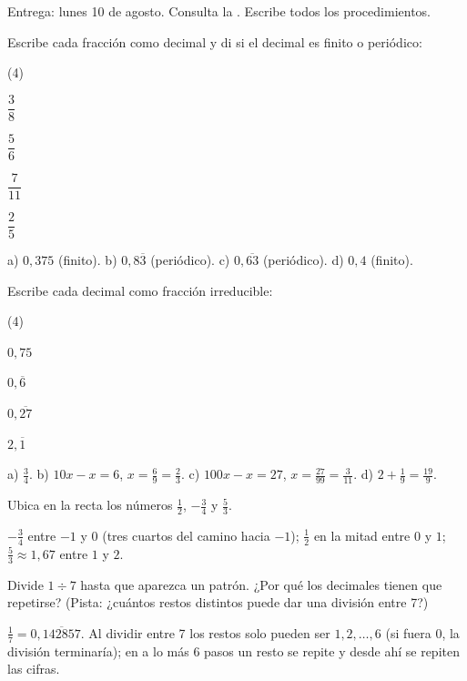 \documentclass[11pt]{article}
\begin{document}
\encabezado

\begin{instrucciones}
Entrega: lunes 10 de agosto. Consulta la . Escribe todos los
procedimientos.
\end{instrucciones}

\begin{preguntas}

\pregunta Escribe cada fracción como decimal y di si el decimal es finito o periódico:
\begin{opciones*}(4)
  \item $\dfrac{3}{8}$
  \item $\dfrac{5}{6}$
  \item $\dfrac{7}{11}$
  \item $\dfrac{2}{5}$
\end{opciones*}
\begin{solucion}[3cm]
a) $0{,}375$ (finito). b) $0{,}8\overline{3}$ (periódico). c) $0{,}\overline{63}$
(periódico). d) $0{,}4$ (finito).
\end{solucion}

\pregunta Escribe cada decimal como fracción irreducible:
\begin{opciones*}(4)
  \item $0{,}75$
  \item $0{,}\overline{6}$
  \item $0{,}\overline{27}$
  \item $2{,}\overline{1}$
\end{opciones*}
\begin{solucion}[4cm]
a) $\frac{3}{4}$. b) $10x - x = 6$, $x = \frac{6}{9} = \frac{2}{3}$. c) $100x - x = 27$,
$x = \frac{27}{99} = \frac{3}{11}$. d) $2 + \frac{1}{9} = \frac{19}{9}$.
\end{solucion}

\pregunta Ubica en la recta los números $\frac{1}{2}$, $-\frac{3}{4}$ y $\frac{5}{3}$.
\begin{center}
\end{center}
\begin{solucion}
$-\frac{3}{4}$ entre $-1$ y $0$ (tres cuartos del camino hacia $-1$); $\frac{1}{2}$ en la
mitad entre $0$ y $1$; $\frac{5}{3} \approx 1{,}67$ entre $1$ y $2$.
\end{solucion}

\pregunta Divide $1 \div 7$ hasta que aparezca un patrón. ¿Por qué los decimales tienen que
repetirse? (Pista: ¿cuántos restos distintos puede dar una división entre 7?)
\begin{solucion}
$\frac{1}{7} = 0{,}\overline{142857}$. Al dividir entre 7 los restos solo pueden ser
$1, 2, \ldots, 6$ (si fuera 0, la división terminaría); en a lo más 6 pasos un resto se
repite y desde ahí se repiten las cifras.
\end{solucion}

\end{preguntas}
\end{document}

